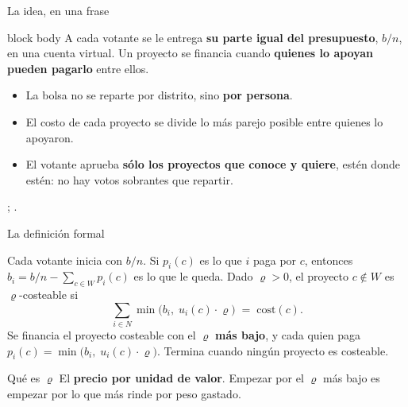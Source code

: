 \documentclass[11pt, aspectratio=169]{beamer}
\newcommand{\voters}{N}                 %
\newcommand{\budget}{b}                 %
\newcommand{\cost}{\mathrm{cost}}       %
\newcommand{\util}{u}                   %
\newcommand{\mesrho}{\ensuremath{\varrho}}          %
\newcommand{\keybox}[1]{%
  \begin{beamercolorbox}[wd=\textwidth, sep=10pt]{block body}
    \centering #1
  \end{beamercolorbox}}
\begin{document}
\begin{frame}{La idea, en una frase}
  \keybox{A cada votante se le entrega \textbf{su parte igual del
    presupuesto}, $\budget/n$, en una cuenta virtual. Un proyecto se financia
    cuando \textbf{quienes lo apoyan pueden pagarlo} entre ellos.}

  \begin{itemize}
    \item La bolsa no se reparte por distrito, sino \textbf{por persona}.
    \item El costo de cada proyecto se divide lo más parejo posible entre
      quienes lo apoyaron.
    \item El votante aprueba \textbf{sólo los proyectos que conoce y quiere},
      estén donde estén: no hay votos sobrantes que repartir.
  \end{itemize}

  \vspace{0.3em}
  {\small \citet{petersskowron2020}; \citet{peters2021}.}
\end{frame}

\begin{frame}{La definición formal}
  \begin{definition}
    Cada votante inicia con $\budget/n$. Si $p_i(c)$ es lo que $i$ paga por $c$,
    entonces $b_i = \budget/n - \sum_{c\in W} p_i(c)$ es lo que le queda. Dado
    $\mesrho>0$, el proyecto $c\notin W$ es \alert{$\mesrho$-costeable} si
    \[
      \sum_{i\in \voters}\min\bigl(b_i,\;\util_i(c)\cdot\mesrho\bigr)\;=\;\cost(c).
    \]
    Se financia el proyecto costeable con el $\mesrho$ \textbf{más bajo}, y cada
    quien paga $p_i(c)=\min\bigl(b_i,\;\util_i(c)\cdot\mesrho\bigr)$. Termina
    cuando ningún proyecto es costeable.
  \end{definition}

  \begin{block}{Qué es $\mesrho$}
    El \textbf{precio por unidad de valor}. Empezar por el $\mesrho$ más bajo es
    empezar por lo que más rinde por peso gastado.
  \end{block}
\end{frame}
\end{document}
